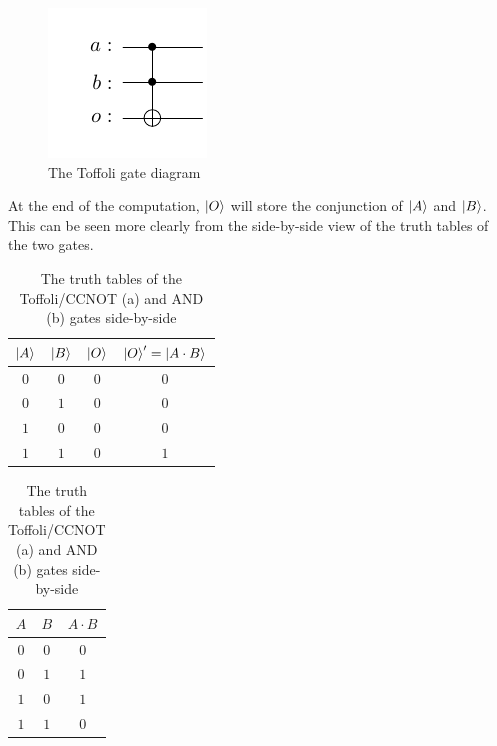 \begin{figure}[ht]
    \centering
    \includegraphics{images/5_Implementation/toffoli_gate_diagram.pdf}
    \caption{The Toffoli gate diagram}
\end{figure}

At the end of the computation, $\ket{O}$ will store the conjunction of $\ket{A}$ and $\ket{B}$. This can be seen more clearly from the side-by-side
view of the truth tables of the two gates.

\begin{table}[ht]
    \centering
    \begin{subtable}[h]{0.45\textwidth}
        \centering
        \begin{tabular}{ccc|c}
            $\ket{A}$ & $\ket{B}$ & $\ket{O}$ & $\ket{O}'=\ket{A \cdot B}$ \\
            \hline
            $0$ & $0$ & $0$ & $0$ \\
            $0$ & $1$ & $0$ & $0$ \\
            $1$ & $0$ & $0$ & $0$ \\
            $1$ & $1$ & $0$ & $1$ \\
        \end{tabular}
        \caption{CCNOT's truth table}
    \end{subtable}
    \begin{subtable}[h]{0.45\textwidth}
        \centering
        \begin{tabular}{cc|c}
            $A$ & $B$ & $A \cdot B$ \\
            \hline
            $0$ & $0$ & $0$ \\
            $0$ & $1$ & $1$ \\
            $1$ & $0$ & $1$ \\
            $1$ & $1$ & $0$ \\
        \end{tabular}
        \caption{AND's truth table}
    \end{subtable}
    \caption{The truth tables of the Toffoli/CCNOT (a) and AND (b) gates side-by-side}
\end{table}

